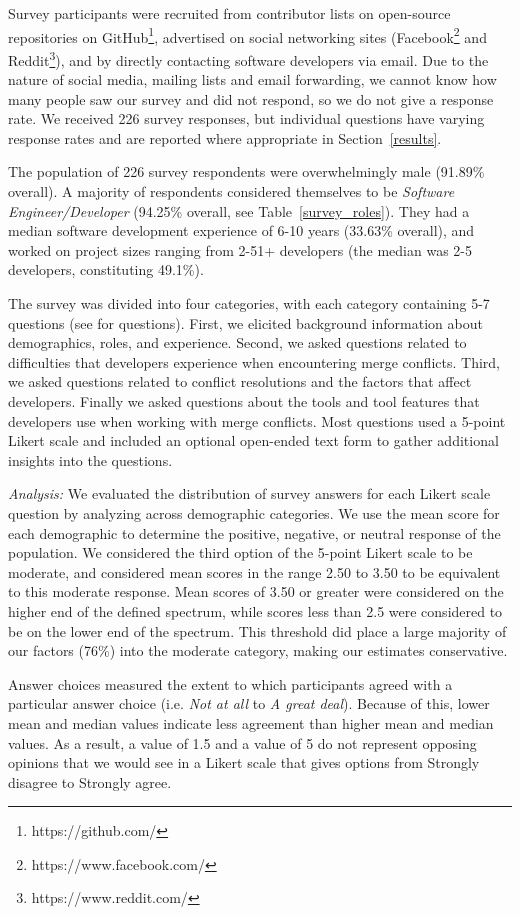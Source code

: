 Survey participants were recruited from contributor lists on open-source repositories on GitHub\footnote{https://github.com/}, advertised on social networking sites (Facebook\footnote{https://www.facebook.com/} and Reddit\footnote{https://www.reddit.com/}), and by directly contacting software developers via email. Due to the nature of social media, mailing lists and email forwarding, we cannot know how many people saw our survey and did not respond, so we do not give a response rate.
We received 226 survey responses, but individual questions have varying response rates and are reported where appropriate in Section~\ref{results}.

The population of 226 survey respondents were overwhelmingly male (91.89\% overall). A majority of respondents considered themselves to be \textit{Software Engineer/Developer} (94.25\% overall, see Table~\ref{survey_roles}). They had a median software development experience of 6-10 years (33.63\% overall), and worked on project sizes ranging from 2-51+ developers (the median was 2-5 developers, constituting 49.1\%).

The survey was divided into four categories, with each category containing 5-7 questions (see \cite{companion_site} for questions).
First, we elicited background information about demographics, roles, and experience.
Second, we asked questions related to difficulties that developers experience when encountering merge conflicts.
Third, we asked questions related to conflict resolutions and the factors that affect developers.
Finally we asked questions about the tools and tool features that developers use when working with merge conflicts.
Most questions used a 5-point Likert scale and included an optional open-ended text form to gather additional insights into the questions. 

\textit{Analysis:} We evaluated the distribution of survey answers for each Likert scale question by analyzing across demographic categories. 
We use the mean score for each demographic to determine the positive, negative, or neutral response of the population. 
We considered the third option of the 5-point Likert scale to be moderate, and considered mean scores in the range 2.50 to 3.50 to be equivalent to this moderate response. Mean scores of 3.50 or greater were considered on the higher end of the defined spectrum, while scores less than 2.5 were considered to be on the lower end of the spectrum. This threshold did place a large majority of our factors (76\%) into the moderate category, making our estimates conservative.

Answer choices measured the extent to which participants agreed with a particular answer choice (i.e. \textit{Not at all} to \textit{A great deal}). Because of this, lower mean and median values indicate less agreement than higher mean and median values. As a result, a value of 1.5 and a value of 5 do not represent opposing opinions that we would see in a Likert scale that gives options from Strongly disagree to Strongly agree.